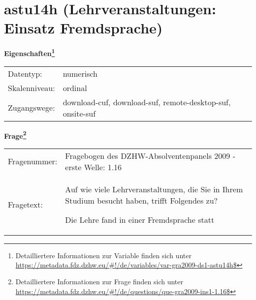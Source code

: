 
    \setcounter{footnote}{0}

    \vspace*{-1.8cm}
	\section{astu14h (Lehrveranstaltungen: Einsatz Fremdsprache)}
	\label{section:astu14h}



    \vspace*{0.5cm}
    \noindent\textbf{Eigenschaften\footnote{Detailliertere Informationen zur Variable finden sich unter
		\url{https://metadata.fdz.dzhw.eu/\#!/de/variables/var-gra2009-ds1-astu14h$}}}\\
	\begin{tabularx}{\hsize}{@{}lX}
	Datentyp: & numerisch \\
	Skalenniveau: & ordinal \\
	Zugangswege: &
	  download-cuf, 
	  download-suf, 
	  remote-desktop-suf, 
	  onsite-suf
 \\
    \end{tabularx}



				\vspace*{0.5cm}
                \noindent\textbf{Frage\footnote{Detailliertere Informationen zur Frage finden sich unter
		              \url{https://metadata.fdz.dzhw.eu/\#!/de/questions/que-gra2009-ins1-1.16$}}}\\
				\begin{tabularx}{\hsize}{@{}lX}
					Fragenummer: &
					  Fragebogen des DZHW-Absolventenpanels 2009 - erste Welle:
					  1.16
 \\
					Fragetext: & Auf wie viele Lehrveranstaltungen, die Sie in Ihrem Studium besucht haben, trifft Folgendes zu?\par  Die Lehre fand in einer Fremdsprache statt \\
				\end{tabularx}





